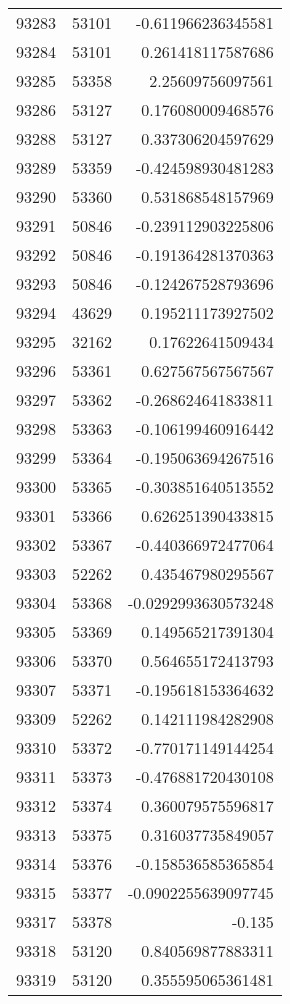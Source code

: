 \begin{tabular}{r | r | r}
93283 & 53101 & -0.611966236345581 \\
93284 & 53101 & 0.261418117587686 \\
93285 & 53358 & 2.25609756097561 \\
93286 & 53127 & 0.176080009468576 \\
93288 & 53127 & 0.337306204597629 \\
93289 & 53359 & -0.424598930481283 \\
93290 & 53360 & 0.531868548157969 \\
93291 & 50846 & -0.239112903225806 \\
93292 & 50846 & -0.191364281370363 \\
93293 & 50846 & -0.124267528793696 \\
93294 & 43629 & 0.195211173927502 \\
93295 & 32162 & 0.17622641509434 \\
93296 & 53361 & 0.627567567567567 \\
93297 & 53362 & -0.268624641833811 \\
93298 & 53363 & -0.106199460916442 \\
93299 & 53364 & -0.195063694267516 \\
93300 & 53365 & -0.303851640513552 \\
93301 & 53366 & 0.626251390433815 \\
93302 & 53367 & -0.440366972477064 \\
93303 & 52262 & 0.435467980295567 \\
93304 & 53368 & -0.0292993630573248 \\
93305 & 53369 & 0.149565217391304 \\
93306 & 53370 & 0.564655172413793 \\
93307 & 53371 & -0.195618153364632 \\
93309 & 52262 & 0.142111984282908 \\
93310 & 53372 & -0.770171149144254 \\
93311 & 53373 & -0.476881720430108 \\
93312 & 53374 & 0.360079575596817 \\
93313 & 53375 & 0.316037735849057 \\
93314 & 53376 & -0.158536585365854 \\
93315 & 53377 & -0.0902255639097745 \\
93317 & 53378 & -0.135 \\
93318 & 53120 & 0.840569877883311 \\
93319 & 53120 & 0.355595065361481 \\

\end{tabular}
